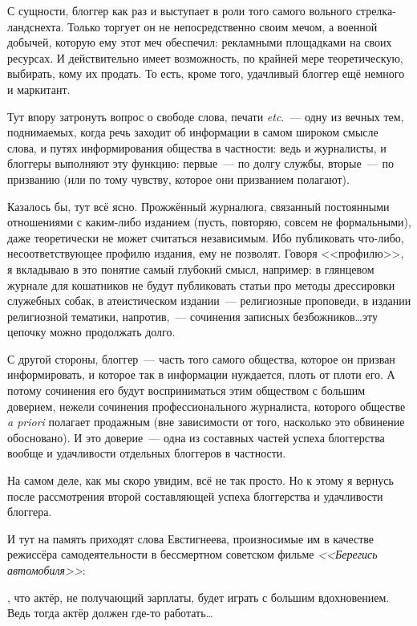 С сущности, блоггер как раз и выступает в роли того самого вольного стрелка-ландснехта. Только торгует он не непосредственно своим мечом, а военной добычей, которую ему этот меч обеспечил: рекламными площадками на своих ресурсах. И действительно имеет возможность, по крайней мере теоретическую, выбирать, кому их продать. То есть, кроме того, удачливый блоггер ещё немного и маркитант.

Тут впору затронуть вопрос о свободе слова, печати \textit{etc}.~--- одну из вечных тем, поднимаемых, когда речь заходит об информации в самом широком смысле слова, и путях информирования общества в частности: ведь и журналисты, и блоггеры выполняют эту функцию: первые~--- по долгу службы, вторые~--- по призванию (или по тому чувству, которое они призванием полагают).

Казалось бы, тут всё ясно. Прожжённый журналюга, связанный постоянными отношениями с каким-либо изданием (пусть, повторяю, совсем не формальными), даже теоретически не может считаться независимым. Ибо публиковать что-либо, несоответствующее профилю издания, ему не позволят. Говоря <<профилю>>, я вкладываю в это понятие самый глубокий смысл, например: в глянцевом журнале для кошатников не будут публиковать статьи про методы дрессировки служебных собак, в атеистическом издании~--- религиозные проповеди, в издании религиозной тематики, напротив,~--- сочинения записных безбожников\dots эту цепочку можно продолжать долго.

С другой стороны, блоггер~--- часть того самого общества, которое он призван информировать, и которое так в информации нуждается, плоть от плоти его. А потому сочинения его будут восприниматься этим обществом с большим доверием, нежели сочинения профессионального журналиста, которого обществе \textit{a priori} полагает продажным (вне зависимости от того, насколько это обвинение обосновано). И это доверие~--- одна из составных частей успеха блоггерства вообще и удачливости отдельных блоггеров в частности.

На самом деле, как мы скоро увидим, всё не так просто. Но к этому я вернусь после рассмотрения второй составляющей успеха блоггерства и удачливости блоггера.

И тут на память приходят слова Евстигнеева, произносимые им в качестве режиссёра самодеятельности в бессмертном советском фильме \textit{<<Берегись автомобиля>>}:


\begin{shadequote}{}
, что актёр, не получающий зарплаты, будет играть с большим вдохновением. Ведь тогда актёр должен где-то работать\dots
\end{shadequote}

